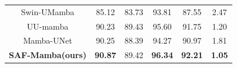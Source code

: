 \documentclass[conference]{IEEEtran}
\begin{document}
\begin{table}[t]
\begin{center}
\begin{tabular}{cccccc}
Swin-UMamba\cite{SwinUMambaMambabasedUNet2024}& 85.12          & 83.73          & 93.81          & 87.55          & 2.47                       \\
UU-mamba\cite{UUmambaUncertaintyawareUmamba2024}                 & 90.23          & 89.43          & 95.60          & 91.75          & 1.20                       \\
Mamba-UNet\cite{MambaUNetUNetPureVisual2024}               & 90.25          & 88.39          & 94.27          & 90.97          & 1.81\\ \hline
\textbf{SAF-Mamba(ours)}    & \textbf{90.87} & 89.42          & \textbf{96.34} & \textbf{92.21} & \textbf{1.05}              \\ \hline
\end{tabular}
\end{center}
\end{table}

 
\end{document}
